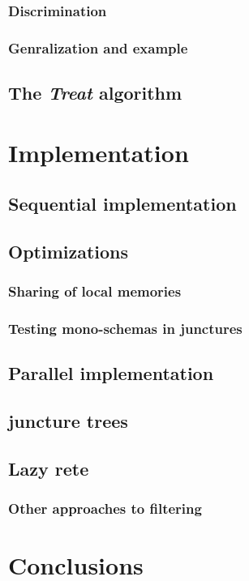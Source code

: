 \subsubsection{Discrimination}

\subsubsection{Genralization and example}

\subsection{The \textit{Treat} algorithm}

\section{Implementation}

\subsection{Sequential implementation}

\subsection{Optimizations}

\subsubsection{Sharing of local memories}

\subsubsection{Testing mono-schemas in junctures}

\subsection{Parallel implementation}

\subsection{juncture trees}

\subsection{Lazy rete}

\subsubsection{Other approaches to filtering}

\section{Conclusions}


